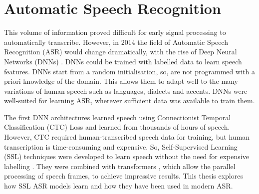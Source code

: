 \section{Automatic Speech Recognition}

This volume of information proved difficult for early signal processing to automatically transcribe. However, in 2014 the field of Automatic Speech Recognition (ASR) would change dramatically, with the rise of Deep Neural Networks (DNNs) \cite{hannun2014deep}. DNNs could be trained with labelled data to learn speech features. DNNs start from a random initialisation, so, are not programmed with a priori knowledge of the domain. This allows them to adapt well to the many variations of human speech such as languages, dialects and accents. DNNs were well-suited for learning ASR, wherever sufficient data was available to train them. %



The first DNN architectures learned speech using Connectionist Temporal Classification (CTC) Loss \cite{graves2006connectionist} and learned from thousands of hours of speech. However, CTC required human-transcribed speech data for training, but human transcription is time-consuming and expensive. So, Self-Supervised Learning (SSL) techniques were developed to learn speech without the need for expensive labelling \cite{wav2vec, hsu2021hubert}. They were combined with transformers \cite{vaswani2017attention}, which allow the parallel processing of speech frames, to achieve impressive results. This thesis explores how SSL ASR models learn and how they have been used in modern ASR.

